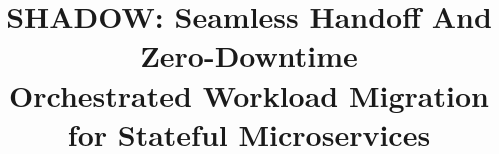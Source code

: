 \documentclass[conference]{IEEEtran}
\begin{document}
\title{SHADOW: Seamless Handoff And Zero-Downtime\\Orchestrated Workload Migration\\for Stateful Microservices}

\author{
}

\maketitle

%
\end{document}
